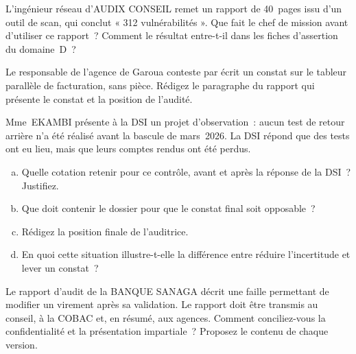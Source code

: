 \begin{boxexo}[title={\ding{45}\quad Exercice~7.7. L'expert \niveaumoyen}]
L'ingénieur réseau d'AUDIX CONSEIL remet un rapport de 40~pages issu d'un
outil de scan, qui conclut « 312 vulnérabilités ». Que fait le chef de
mission avant d'utiliser ce rapport~? Comment le résultat entre-t-il dans
les fiches d'assertion du domaine~D~?
\end{boxexo}

\begin{boxexo}[title={\ding{45}\quad Exercice~7.8. L'audité qui refuse \niveaumoyen}]
Le responsable de l'agence de Garoua conteste par écrit un constat sur le
tableur parallèle de facturation, sans pièce. Rédigez le paragraphe du
rapport qui présente le constat et la position de l'audité.
\end{boxexo}

\begin{boxexo}[title={\ding{45}\quad Exercice~7.9. Le contradictoire à la BANQUE SANAGA \niveauexpert}]
Mme~EKAMBI présente à la DSI un projet d'observation~: aucun test de retour
arrière n'a été réalisé avant la bascule de mars~2026. La DSI répond que des
tests ont eu lieu, mais que leurs comptes rendus ont été perdus.
\begin{enumerate}[(a)]
    \item Quelle cotation retenir pour ce contrôle, avant et après la
          réponse de la DSI~? Justifiez.
    \item Que doit contenir le dossier pour que le constat final soit
          opposable~?
    \item Rédigez la position finale de l'auditrice.
    \item En quoi cette situation illustre-t-elle la différence entre réduire
          l'incertitude et lever un constat~?
\end{enumerate}
\end{boxexo}

\begin{boxexo}[title={\ding{45}\quad Exercice~7.10. Concilier deux principes \niveauexpert}]
Le rapport d'audit de la BANQUE SANAGA décrit une faille permettant de
modifier un virement après sa validation. Le rapport doit être transmis au
conseil, à la COBAC et, en résumé, aux agences. Comment conciliez-vous la
confidentialité et la présentation impartiale~? Proposez le contenu de
chaque version.
\end{boxexo}

\bigskip

